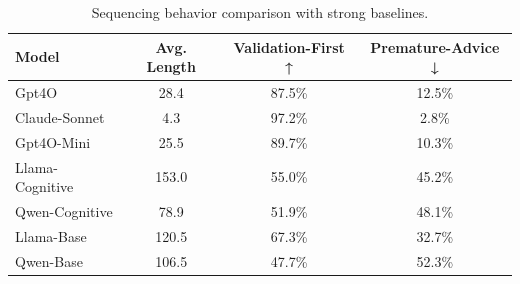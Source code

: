 \begin{table}[t]
\centering
\caption{Sequencing behavior comparison with strong baselines.}
\label{tab:sequence_baselines}
\begin{tabular}{lccc}
\toprule
Model & Avg. Length & Validation-First ↑ & Premature-Advice ↓ \\
\midrule
Gpt4O & 28.4 & 87.5\% & 12.5\% \\
Claude-Sonnet & 4.3 & 97.2\% & 2.8\% \\
Gpt4O-Mini & 25.5 & 89.7\% & 10.3\% \\
Llama-Cognitive & 153.0 & 55.0\% & 45.2\% \\
Qwen-Cognitive & 78.9 & 51.9\% & 48.1\% \\
Llama-Base & 120.5 & 67.3\% & 32.7\% \\
Qwen-Base & 106.5 & 47.7\% & 52.3\% \\
\bottomrule
\end{tabular}
\end{table}
